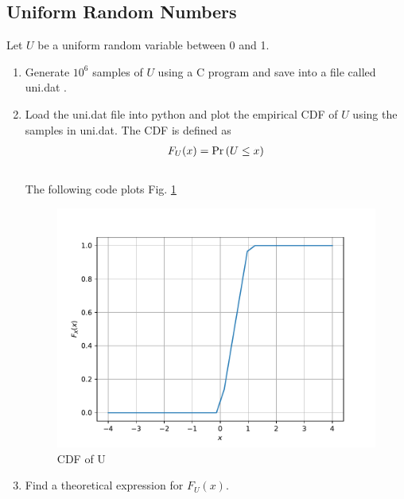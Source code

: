 \documentclass[10pt, a4paper]{article}
\begin{document}
 \subsection{Uniform Random Numbers}
Let $U$ be a uniform random variable between 0 and 1.
\begin{enumerate}
\item Generate $10^6$ samples of $U$ using a C program and save into a file called uni.dat .

\begin{center}
\end{center}
\item
Load the uni.dat file into python and plot the empirical CDF of $U$ using the samples in uni.dat. The CDF is defined as
\begin{align}
F_{U}(x) = \Pr\left(U \le x\right)
\end{align}
\\
\solution  The following code plots Fig. \ref{fig:cdf of u}
\begin{center}
\end{center}
\begin{figure}[!ht]
\centering
\includegraphics[scale=0.5]{images/uni_cdf.pdf}
\caption{CDF of U}
\label{fig:cdf of u}
\end{figure}
\item
Find a  theoretical expression for $F_{U}(x)$.

\end{enumerate}
\end{document}
